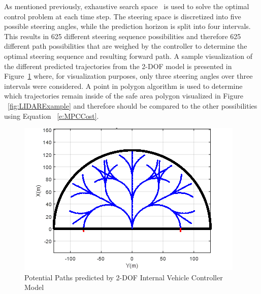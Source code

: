 \documentclass[12pt,onecolumn]{report}
\begin{document}
As mentioned previously, exhaustive search space~\cite{ModelFidelity2016} is used to solve the optimal control problem at each time step. The steering space is discretized into five possible steering angles, while the prediction horizon is split into four intervals. This results in 625 different steering sequence possibilities and therefore 625 different path possibilities that are weighed by the controller to determine the optimal steering sequence and resulting forward path. A sample visualization of the different predicted trajectories from the 2-DOF model is presented in Figure~\ref{fig:PossiblePaths} where, for visualization purposes, only three steering angles over three intervals were considered. A point in polygon algorithm is used to determine which trajectories remain inside of the safe area polygon visualized in Figure ~\ref{fig:LIDARExample} and therefore should be compared to the other possibilities using Equation ~\ref{e:MPCCost}.

\begin{figure}
	\centering
	\includegraphics[width=\columnwidth]{Figs/PathPossibilities.png}
	\caption{\small Potential Paths predicted by 2-DOF Internal Vehicle Controller Model}  
	\label{fig:PossiblePaths}
\end{figure}
 
\end{document}
